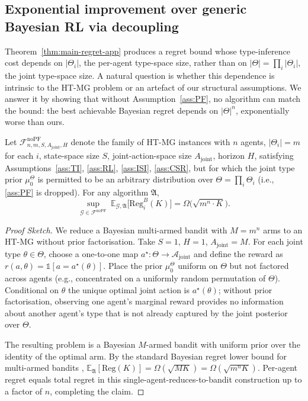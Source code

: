 \subsection{Exponential improvement over generic Bayesian RL via decoupling}
\label{sec:exponential-improvement}

Theorem~\ref{thm:main-regret-app} produces a regret bound whose type-inference cost depends on $|\Theta_i|$, the per-agent type-space size, rather than on $|\Theta| = \prod_i |\Theta_i|$, the joint type-space size. A natural question is whether this dependence is intrinsic to the HT-MG problem or an artefact of our structural assumptions. We answer it by showing that without Assumption~\ref{ass:PF}, no algorithm can match the bound: the best achievable Bayesian regret depends on $|\Theta|^n$, exponentially worse than ours.

\begin{theorem}
\label{thm:lower-no-pf}
Let $\mathcal{F}^{\mathrm{noPF}}_{n, m, S, A_{\mathrm{joint}}, H}$ denote the family of HT-MG instances with $n$ agents, $|\Theta_i| = m$ for each $i$, state-space size $S$, joint-action-space size $A_{\mathrm{joint}}$, horizon $H$, satisfying Assumptions~\ref{ass:TI}, \ref{ass:RL}, \ref{ass:ISI}, \ref{ass:CSR}, but for which the joint type prior $\mu_0^\Theta$ is permitted to be an arbitrary distribution over $\Theta = \prod_i \Theta_i$ (i.e., \ref{ass:PF} is dropped). For any algorithm $\mathfrak{A}$,
\begin{equation}
\sup_{\mathcal{G} \in \mathcal{F}^{\mathrm{noPF}}}\ \mathbb{E}_{\mathcal{G}, \mathfrak{A}}\big[\mathrm{Reg}_i^B(K)\big] = \Omega\big(\sqrt{m^n \cdot K}\big).
\end{equation}
\end{theorem}

\begin{proof}[Proof Sketch]
We reduce a Bayesian multi-armed bandit with $M = m^n$ arms to an HT-MG without prior factorisation. Take $S = 1$, $H = 1$, $A_{\mathrm{joint}} = M$. For each joint type $\theta \in \Theta$, choose a one-to-one map $a^\star \colon \Theta \to \mathcal{A}_{\mathrm{joint}}$ and define the reward as $r(a, \theta) = \mathbb{1}[a = a^\star(\theta)]$. Place the prior $\mu_0^\Theta$ uniform on $\Theta$ but not factored across agents (e.g., concentrated on a uniformly random permutation of $\Theta$). Conditional on $\theta$ the unique optimal joint action is $a^\star(\theta)$; without prior factorisation, observing one agent's marginal reward provides no information about another agent's type that is not already captured by the joint posterior over $\Theta$.

The resulting problem is a Bayesian $M$-armed bandit with uniform prior over the identity of the optimal arm. By the standard Bayesian regret lower bound for multi-armed bandits \citep[Theorem 15.2]{lattimore2020bandit},
$\mathbb{E}_{\mathfrak{A}}[\mathrm{Reg}(K)] = \Omega(\sqrt{MK}) = \Omega(\sqrt{m^n K})$.
Per-agent regret equals total regret in this single-agent-reduces-to-bandit construction up to a factor of $n$, completing the claim.
\end{proof}

